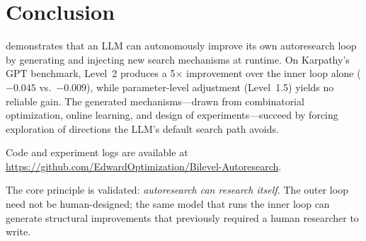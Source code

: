 \section{Conclusion}
\label{sec:conclusion}

\methodname{} demonstrates that an LLM can autonomously improve its own
autoresearch loop by generating and injecting new search mechanisms at runtime.
On Karpathy's GPT benchmark, Level~2 produces a 5$\times$ \valbpb{}
improvement over the inner loop alone ($-0.045$ vs.\ $-0.009$), while
parameter-level adjustment (Level~1.5) yields no reliable gain.
The generated mechanisms---drawn from combinatorial optimization, online
learning, and design of experiments---succeed by forcing exploration of
directions the LLM's default search path avoids.

Code and experiment logs are available at
\url{https://github.com/EdwardOptimization/Bilevel-Autoresearch}.

The core principle is validated: \emph{autoresearch can research itself.}
The outer loop need not be human-designed; the same model that runs the inner
loop can generate structural improvements that previously required a human
researcher to write.
